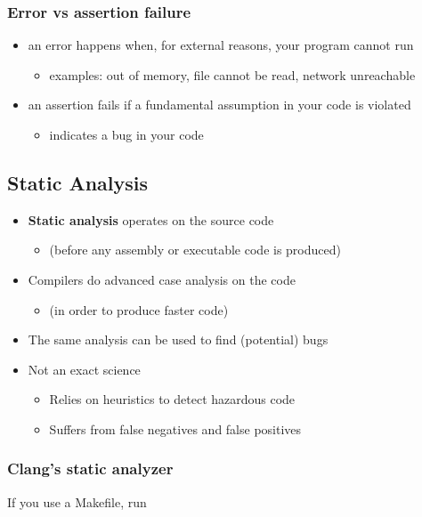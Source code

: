 \documentclass[12pt]{article}
\begin{document}
\subsubsection{Error vs assertion failure}

\begin{itemize}
  \item an error happens when, for external reasons, your program cannot run
  \begin{itemize}
    \item examples: out of memory, file cannot be read, network unreachable
  \end{itemize}
  \item an assertion fails if a fundamental assumption in your code is violated
  \begin{itemize}
    \item indicates a bug in your code
  \end{itemize}
\end{itemize}
\subsection{Static Analysis}

\begin{itemize}
  \item \textbf{Static analysis} operates on the source code
  \begin{itemize}
    \item (before any assembly or executable code is produced)
  \end{itemize}
  \item Compilers do advanced case analysis on the code
  \begin{itemize}
    \item (in order to produce faster code)
  \end{itemize}
  \item The same analysis can be used to find (potential) bugs

  \item Not an exact science
  \begin{itemize}
    \item Relies on heuristics to detect hazardous code
    \item Suffers from false negatives and false positives
  \end{itemize}
\end{itemize}
\subsubsection{Clang's static analyzer}
If you use a Makefile, run
\end{document}
